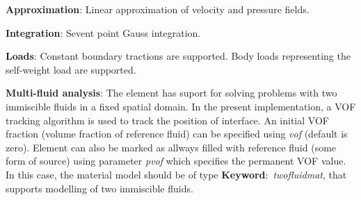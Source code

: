 \documentclass[12pt,dvips]{article}
\newcommand{\descitem}[1]{{\noindent \bf #1}:}
\newcommand{\elemkeyword}[1]{\descitem{Keyword}~{\em #1}}
\newcommand{\param}[1]{{\it #1}}
\begin{document}
\descitem{Approximation} Linear approximation of velocity and pressure
fields.

\descitem{Integration}
Sevent point Gauss integration.

\descitem{Loads} Constant boundary tractions are supported. Body loads
representing the self-weight load are supported.

\descitem{Multi-fluid analysis} The element has suport for solving
problems with two immiscible fluids in
a fixed spatial domain. In the present implementation, a VOF tracking algorithm
is used to track the position of interface. An initial VOF fraction
(volume fraction of reference fluid) can be specified using
\param{vof} (default is zero). Element can also be marked as allways
filled with reference fluid (some form of source) using parameter
\param{pvof} which specifies the permanent VOF value. In this case,
the material model should be of type \elemkeyword{twofluidmat}, that
supports modelling of two immiscible fluids.
\end{document}
